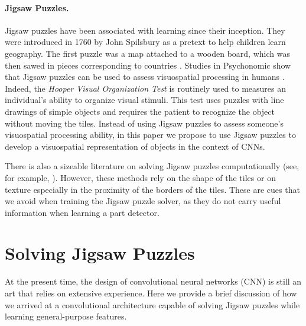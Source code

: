 \documentclass[runningheads]{llncs}
\begin{document}
\paragraph{\textbf{Jigsaw Puzzles.}}

Jigsaw puzzles have been associated with learning since their inception. They were introduced in 1760 by John Spilsbury as a pretext to help children learn geography. The first puzzle was a map attached to a wooden board, which was then sawed in pieces corresponding to countries \cite{Tybon04}. Studies in Psychonomic show that Jigsaw puzzles can be used to assess visuospatial processing in humans \cite{richardsonVecchi02}. Indeed, the \emph{Hooper Visual Organization Test} \cite{Hooper1983} is routinely used to measures an individual's ability to organize visual stimuli. This test uses puzzles with line drawings of simple objects and requires the patient to recognize the object without moving the tiles. Instead of using Jigsaw puzzles to assess someone's visuospatial processing ability, in this paper we propose to use Jigsaw puzzles to develop a visuospatial representation of objects in the context of CNNs.

There is also a sizeable literature on solving Jigsaw puzzles computationally (see, for example,  \cite{Pomeranz04,FreemanG64,PomeranzSB11}). However, these methods rely on the shape of the tiles or on texture especially in the proximity of the borders of the tiles. These are cues that we avoid when training the Jigsaw puzzle solver, as they do not carry useful information when learning a part detector. 

 
\section{Solving Jigsaw Puzzles}
 
At the present time, the design of convolutional neural networks (CNN) is still an art that relies on extensive experience. Here we provide a brief discussion of how we arrived at a convolutional architecture capable of solving Jigsaw puzzles while learning general-purpose features.
\end{document}
